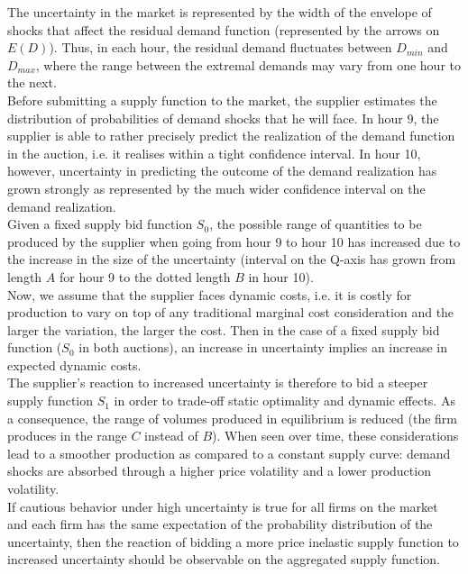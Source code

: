 The uncertainty in the market is represented by the width of the envelope of shocks that affect the residual demand function (represented by the arrows on $E(D)$). Thus, in each hour, the residual demand fluctuates between $D_{min}$ and $D_{max}$, where the range between the extremal demands may vary from one hour to the next. \\
 
Before submitting a supply function to the market, the supplier estimates the distribution of probabilities of demand shocks that he will face. In hour 9, the supplier is able to rather precisely predict the realization of the demand function in the auction, i.e. it realises within a tight confidence interval. In hour 10, however, uncertainty in predicting the outcome of the demand realization has grown strongly as represented by the much wider confidence interval on the demand realization. \\

Given a fixed supply bid function $S_0$, the possible range of quantities to be produced by the supplier when going from hour 9 to hour 10 has increased due to the increase in the size of the uncertainty (interval on the Q-axis has grown from length $A$ for hour 9 to the dotted length $B$ in hour 10).\\

Now, we assume that the supplier faces dynamic costs, i.e. it is costly for production to vary on top of any traditional marginal cost consideration and the larger the variation, the larger the cost. Then in the case of a fixed supply bid function ($S_0$ in both auctions), an increase in uncertainty implies an increase in expected dynamic costs. \\

The supplier's reaction to increased uncertainty is therefore to bid a steeper supply function $S_1$ in order to trade-off static optimality and dynamic effects. As a consequence, the range of volumes produced in equilibrium is reduced (the firm produces in the range $C$ instead of $B$). When seen over time, these considerations lead to a smoother production as compared to a constant supply curve: demand shocks are absorbed through a higher price volatility and a lower production volatility. \\

If cautious behavior under high uncertainty is true for all firms on the market and each firm has the same expectation of the probability distribution of the uncertainty, then the reaction of bidding a more price inelastic supply function to increased uncertainty should be observable on the aggregated supply function. \\

